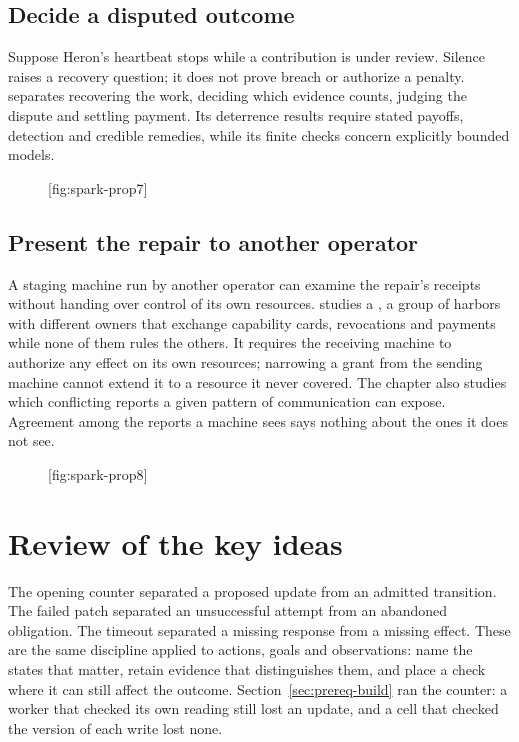 \subsection{Decide a disputed outcome}
Suppose Heron's heartbeat stops while a contribution is under review. Silence
raises a recovery question; it does not prove breach or authorize a penalty.
 separates recovering the work, deciding which evidence counts,
judging the dispute and settling payment. Its deterrence results require stated payoffs, detection and
credible remedies, while its finite checks concern explicitly bounded models.

\begin{figure}[tp]
  \centering
  [fig:spark-prop7]
\end{figure}

\subsection{Present the repair to another operator}
A staging machine run by another operator can examine the repair's receipts
without handing over control of its own resources.  studies a
, a group of harbors with different owners that exchange
capability cards, revocations and payments while none of them rules the
others. It requires the receiving machine to authorize any effect on its own
resources; narrowing a
grant from the sending machine cannot extend it to a resource it never
covered. The chapter also studies which conflicting reports a given pattern of
communication can expose. Agreement among the reports a machine sees says
nothing about the ones it does not see.

\begin{figure}[tp]
  \centering
  [fig:spark-prop8]
\end{figure}

\section{Review of the key ideas}
The opening counter separated a proposed update from an admitted transition.
The failed patch separated an unsuccessful attempt from an abandoned obligation.
The timeout separated a missing response from a missing effect. These are the
same discipline applied to actions, goals and observations: name the states
that matter, retain evidence that distinguishes them, and place a check where
it can still affect the outcome. Section~\ref{sec:prereq-build} ran the
counter: a worker that checked its own reading still lost an update, and a
cell that checked the version of each write lost none.

